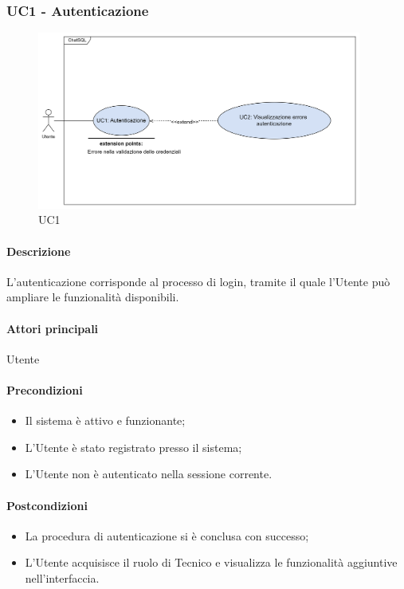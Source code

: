 \subsubsection{UC1 - Autenticazione}\label{UC1}

\begin{figure}[H]
  \centering
  \includegraphics[width=0.95\textwidth]{assets/uc1.png}
  \caption{UC1}
\end{figure}

\paragraph*{Descrizione}
L'autenticazione corrisponde al processo di login, tramite il quale l'Utente può ampliare le funzionalità disponibili.

\paragraph*{Attori principali}
Utente

\paragraph*{Precondizioni}
\begin{itemize}
  \item Il sistema è attivo e funzionante;
  \item L'Utente è stato registrato presso il sistema;
  \item L'Utente non è autenticato nella sessione corrente.
\end{itemize}

\paragraph*{Postcondizioni}
\begin{itemize}
  \item La procedura di autenticazione si è conclusa con successo;
  \item L'Utente acquisisce il ruolo di Tecnico e visualizza le funzionalità aggiuntive nell'interfaccia.  
\end{itemize}


